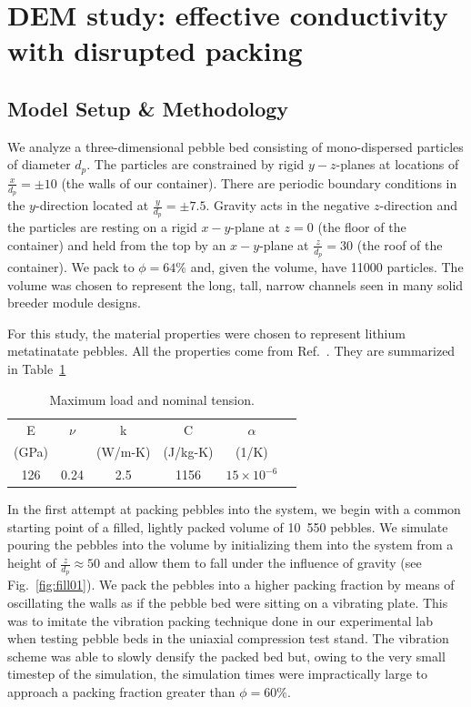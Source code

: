 \section{DEM study: effective conductivity with disrupted packing}
\label{sec:dem-studies-effective-conductivity}

\subsection{Model Setup \& Methodology}\label{sec:dem-setup}
We analyze a three-dimensional pebble bed consisting of mono-dispersed particles of diameter $d_p$. The particles are constrained by rigid $y-z$-planes at locations of $\frac{x}{d_p} = \pm 10$ (the walls of our container). There are periodic boundary conditions in the $y$-direction located at $\frac{y}{d_p} = \pm 7.5$. Gravity acts in the negative $z$-direction and the particles are resting on a rigid $x-y$-plane at $z=0$ (the floor of the container) and held from the top by an $x-y$-plane at $\frac{z}{d_p} = 30$ (the roof of the container). We pack to $\phi = 64\%$ and, given the volume, have 11000 particles. The volume was chosen to represent the long, tall, narrow channels seen in many solid breeder module designs\cite{ Cho2008, Poitevin2010, Enoeda2003}.

For this study, the material properties were chosen to represent lithium metatinatate pebbles. All the properties come from Ref.~\cite{Gierszewski1998}. They are summarized in Table~\ref{tab:mat-props}

\begin {table}[tp] %
\caption{Maximum load and nominal tension.}
\label {tab:mat-props} \centering %
\begin {tabular}{ cccccc }
\toprule %
E           &     $\nu$    	&    k         	&    C          &   $\alpha$                \\
(GPa)    	&            	& (W/m-K) 		&  (J/kg-K)  	&   (1/K)                   \\\toprule
126			&      0.24     &  2.5          &  1156       	&   $15\times10^{-6}$		\\\bottomrule
\end{tabular}
\end{table}

In the first attempt at packing pebbles into the system, we begin with a common starting point of a filled, lightly packed volume of 10~550 pebbles. We simulate pouring the pebbles into the volume by initializing them into the system from a height of $\frac{z}{d_p} \approx 50$ and allow them to fall under the influence of gravity (see Fig.~\ref{fig:fill01}). We pack the pebbles into a higher packing fraction by means of oscillating the walls as if the pebble bed were sitting on a vibrating plate. This was to imitate the vibration packing technique done in our experimental lab when testing pebble beds in the uniaxial compression test stand. The vibration scheme was able to slowly densify the packed bed but, owing to the very small timestep of the simulation, the simulation times were impractically large to approach a packing fraction greater than $\phi = 60\%$. 

